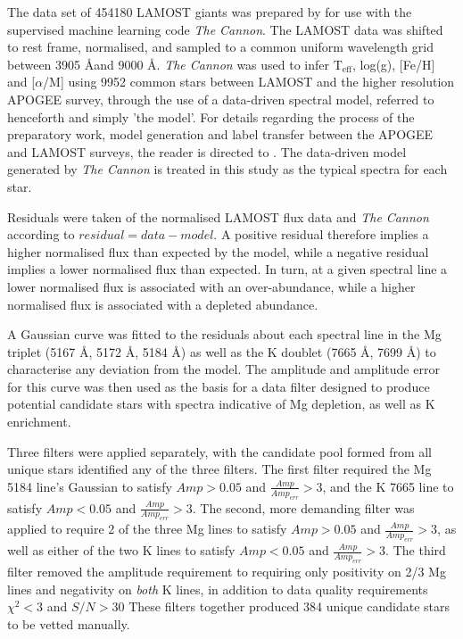 \documentclass[a4paper,fleqn,usenatbib]{mnras}
\begin{document}
The data set of 454180 LAMOST giants was prepared by \citet{ho2017} for use with the supervised machine learning code \textit{The Cannon}. The LAMOST data was shifted to rest frame, normalised, and sampled to a common uniform wavelength grid between 3905 \AA and 9000 \AA. \textit{The Cannon} was used to infer $\text{T}_{\text{eff}}$, log(g), [Fe/H] and [$\alpha$/M] using 9952 common stars between LAMOST and the higher resolution APOGEE survey, through the use of a data-driven spectral model, referred to henceforth and simply 'the model'. For details regarding the process of the preparatory work, model generation and label transfer between the APOGEE and LAMOST surveys, the reader is directed to \citet{ho2017}. The data-driven model generated by \textit{The Cannon} is treated in this study as the typical spectra for each star.

Residuals were taken of the normalised LAMOST flux data and 
\textit{The Cannon} according to $residual=data-model$. A positive residual therefore implies a higher normalised flux than expected by the model, while a negative residual implies a lower normalised flux than expected. In turn, at a given spectral line a lower normalised flux is associated with an over-abundance, while a higher normalised flux is associated with a depleted abundance.

A Gaussian curve was fitted to the residuals about each spectral line in the Mg triplet (5167 \AA, 5172 \AA, 5184 \AA) as well as the K doublet (7665 \AA, 7699 \AA) to characterise any deviation from the model. The amplitude and amplitude error for this curve was then used as the basis for a data filter designed to produce potential candidate stars with spectra indicative of Mg depletion, as well as K enrichment.

Three filters were applied separately, with the candidate pool formed from all unique stars identified any of the three filters. The first filter required the Mg 5184 line's Gaussian to satisfy $Amp > 0.05$ and $\frac{Amp}{Amp_{err}}>3$, and the K 7665 line to satisfy $Amp < 0.05$ and $\frac{Amp}{Amp_{err}}>3$. The second, more demanding filter was applied to require 2 of the three Mg lines to satisfy $Amp > 0.05$ and $\frac{Amp}{Amp_{err}}>3$, as well as either of the two K lines to satisfy $Amp < 0.05$ and $\frac{Amp}{Amp_{err}}>3$. The third filter removed the amplitude requirement to requiring only positivity on 2/3 Mg lines and negativity on \textit{both} K lines, in addition to data quality requirements $\chi^2<3$ and $S/N>30$
These filters together produced 384 unique candidate stars to be vetted manually.
\end{document}
